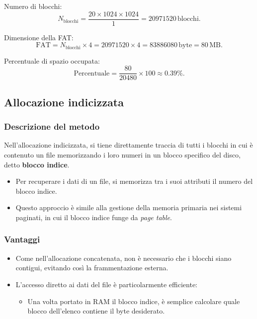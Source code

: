 \noindent
Numero di blocchi:
\[
N_{\text{blocchi}} = \frac{20 \times 1024 \times 1024}{1} = 20971520 \, \text{blocchi}.
\]

\noindent
Dimensione della FAT:
\[
\text{FAT} = N_{\text{blocchi}} \times 4 = 20971520 \times 4 = 83886080 \, \text{byte} = 80 \, \text{MB}.
\]

\noindent
Percentuale di spazio occupata:
\[
\text{Percentuale} = \frac{80}{20480} \times 100 \approx 0.39\%.
\]



\subsection{Allocazione indicizzata}

\subsubsection{Descrizione del metodo}
Nell’allocazione indicizzata, si tiene direttamente traccia di tutti i blocchi in cui è contenuto un file memorizzando i loro numeri in un blocco specifico del disco, detto \textbf{blocco indice}.  
\begin{itemize}
    \item Per recuperare i dati di un file, si memorizza tra i suoi attributi il numero del blocco indice.
    \item Questo approccio è simile alla gestione della memoria primaria nei sistemi paginati, in cui il blocco indice funge da \textit{page table}.
\end{itemize}

\subsubsection{Vantaggi}
\begin{itemize}
    \item Come nell’allocazione concatenata, non è necessario che i blocchi siano contigui, evitando così la frammentazione esterna.
    \item L’accesso diretto ai dati del file è particolarmente efficiente:
          \begin{itemize}
              \item Una volta portato in RAM il blocco indice, è semplice calcolare quale blocco dell’elenco contiene il byte desiderato.
          \end{itemize}
\end{itemize}

